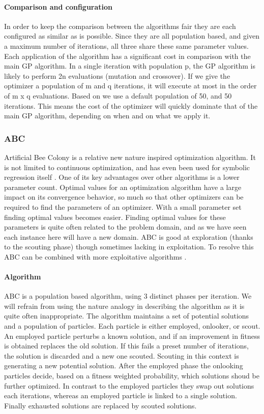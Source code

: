 \paragraph{Comparison and configuration}
In order to keep the comparison between the algorithms fair they are each configured as similar as is possible. Since they are all population based, and given a maximum number of iterations, all three share these same parameter values. Each application of the algorithm has a significant cost in comparison with the main GP algorithm. In a single iteration with population p, the GP algorithm is likely to perform 2n evaluations (mutation and crossover). If we give the optimizer a population of m and q iterations, it will execute at most in the order of  m x q evaluations. Based on \cite{PSO} we use a default population of 50, and 50 iterations. This means the cost of the optimizer will quickly dominate that of the main GP algorithm, depending on when and on what we apply it.
\subsubsection{ABC}
Artificial Bee Colony \citep{ABC} is a relative new nature inspired optimization algorithm. It is not limited to continuous optimization, and has even been used for symbolic regression itself \cite{ABCSR}. One of its key advantages over other algorithms is a lower parameter count. Optimal values for an optimization algorithm have a large impact on its convergence behavior, so much so that other optimizers can be required to find the parameters of an optimizer. With a small parameter set finding optimal values becomes easier. Finding optimal values for these parameters is quite often related to the problem domain, and as we have seen each instance here will have a new domain. ABC is good at exploration (thanks to the scouting phase) though sometimes lacking in exploitation. To resolve this ABC can be combined with more exploitative algorithms \citep{ABCPSO}.
\paragraph{Algorithm}
ABC is a population based algorithm, using 3 distinct phases per iteration. We will refrain from using the nature analogy in describing the algorithm as it is quite often inappropriate. The algorithm maintains a set of potential solutions and a population of particles. Each particle is either employed, onlooker, or scout. An employed particle perturbs a known solution, and if an improvement in fitness is obtained replaces the old solution. If this fails a preset number of iterations, the solution is discarded and a new one scouted. Scouting in this context is generating a new potential solution. After the employed phase the onlooking particles decide, based on a fitness weighted probability, which solutions shoud be further optimized. In contrast to the employed particles they swap out solutions each iterations, whereas an employed particle is linked to a single solution. Finally exhausted solutions are replaced by scouted solutions.

